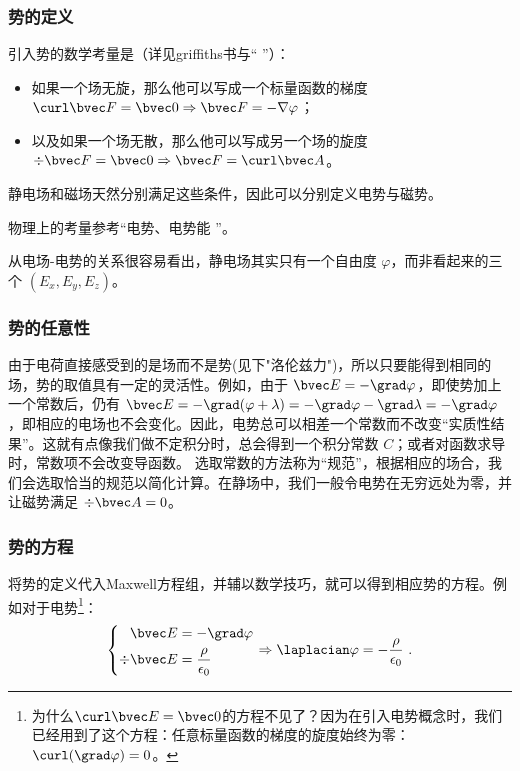 \subsubsection{势的定义}
引入势的数学考量是（详见griffiths书与“ ”）：
\begin{itemize}
\item 如果一个场无旋，那么他可以写成一个标量函数的梯度 $\curl \bvec F = \bvec 0 \Rightarrow \bvec F = - \nabla \varphi$；
\item 以及如果一个场无散，那么他可以写成另一个场的旋度$\div \bvec F = \bvec 0 \Rightarrow \bvec F = \curl \bvec A$。
\end{itemize}
静电场和磁场天然分别满足这些条件，因此可以分别定义电势与磁势。

物理上的考量参考“电势、电势能 ”。

从电场-电势的关系很容易看出，静电场其实只有一个自由度 $\varphi$，而非看起来的三个 $(E_x, E_y, E_z)$。

\subsubsection{势的任意性}
由于电荷直接感受到的是场而不是势(见下"洛伦兹力")，所以只要能得到相同的场，势的取值具有一定的灵活性。例如，由于 $\bvec E = -\grad \varphi$，即使势加上一个常数后，仍有 $\bvec E = -\grad (\varphi+\lambda) = -\grad \varphi - \grad \lambda = -\grad \varphi$，即相应的电场也不会变化。因此，电势总可以相差一个常数而不改变“实质性结果”。这就有点像我们做不定积分时，总会得到一个积分常数 $C$；或者对函数求导时，常数项不会改变导函数。
选取常数的方法称为“规范”，根据相应的场合，我们会选取恰当的规范以简化计算。在静场中，我们一般令电势在无穷远处为零，并让磁势满足 $\div \bvec A = 0$。

\subsubsection{势的方程}
将势的定义代入Maxwell方程组，并辅以数学技巧，就可以得到相应势的方程。例如对于电势\footnote{为什么$\curl \bvec E = \bvec 0$的方程不见了？因为在引入电势概念时，我们已经用到了这个方程：任意标量函数的梯度的旋度始终为零：$\curl (\grad \varphi) = 0$。}：
$$
\left \{
\begin{aligned}
\bvec E &= -\grad \varphi\\
\div \bvec E &= \frac{\rho}{\epsilon_0}\\
\end{aligned}
\right.
\Rightarrow
\laplacian \varphi = -\frac{\rho}{\epsilon_0}
~.
$$

